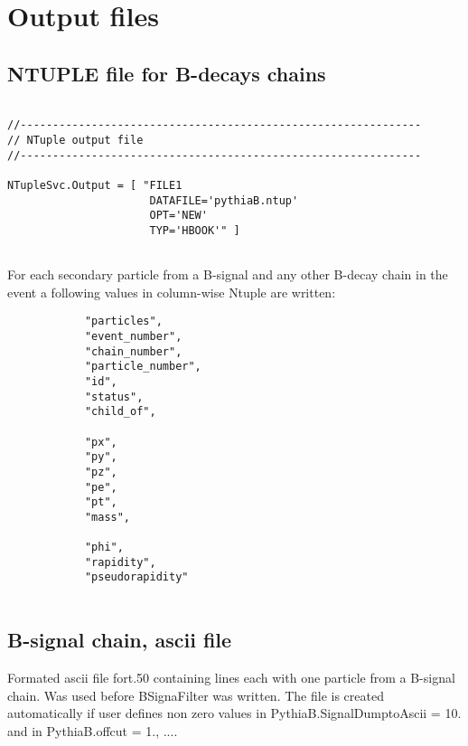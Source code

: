 \section{  Output files }

\subsection{NTUPLE file for B-decays chains}

\begin{verbatim}

//--------------------------------------------------------------
// NTuple output file
//--------------------------------------------------------------

NTupleSvc.Output = [ "FILE1
                      DATAFILE='pythiaB.ntup'
                      OPT='NEW'
                      TYP='HBOOK'" ]


\end{verbatim}


For each secondary particle from a B-signal and any other B-decay
chain in the event a following values in column-wise Ntuple are
written:

\begin{verbatim}
            "particles",
            "event_number",
            "chain_number",
            "particle_number",
            "id",
            "status",
            "child_of",

            "px",
            "py",
            "pz",
            "pe",
            "pt",
            "mass",

            "phi",
            "rapidity",
            "pseudorapidity"


\end{verbatim}




\subsection{B-signal chain, ascii file  }

Formated ascii file fort.50 containing lines each with one
particle from a B-signal chain.  Was used before BSignaFilter was
written. The file is created automatically if user defines non
zero values in PythiaB.SignalDumptoAscii = 10. and in
PythiaB.offcut = { 1., ...}.


